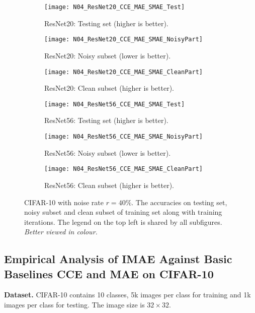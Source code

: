 \documentclass{article}
\begin{document}
\begin{figure*}[!t]
	\centering
	\vspace{-0.3cm}
	\begin{subfigure}[t!]{0.33\linewidth}
		\centering
		\texttt{[image: N04\_ResNet20\_CCE\_MAE\_SMAE\_Test]}
		\caption{ResNet20: Testing set (higher is better).}
	\end{subfigure}\begin{subfigure}[t!]{0.33\linewidth}
		\centering
		\texttt{[image: N04\_ResNet20\_CCE\_MAE\_SMAE\_NoisyPart]}
		\caption{ResNet20: Noisy subset (lower is better).}
	\end{subfigure}
	\begin{subfigure}[t!]{0.33\linewidth}
		\centering
		\texttt{[image: N04\_ResNet20\_CCE\_MAE\_SMAE\_CleanPart]}
		\caption{ResNet20: Clean subset (higher is better).}
	\end{subfigure}
\begin{subfigure}[t!]{0.33\linewidth}
		\centering
		\texttt{[image: N04\_ResNet56\_CCE\_MAE\_SMAE\_Test]}
		\caption{ResNet56: Testing set (higher is better).}
	\end{subfigure}\begin{subfigure}[t!]{0.33\linewidth}
		\centering
		\texttt{[image: N04\_ResNet56\_CCE\_MAE\_SMAE\_NoisyPart]}
		\caption{ResNet56: Noisy subset  (lower is better).}
	\end{subfigure}
	\begin{subfigure}[t!]{0.33\linewidth}
		\centering
		\texttt{[image: N04\_ResNet56\_CCE\_MAE\_SMAE\_CleanPart]}
		\caption{ResNet56: Clean subset (higher is better).}
	\end{subfigure}
\caption{CIFAR-10 with noise rate $r=40\%$. The accuracies on testing set, noisy subset and clean subset of training set along with training iterations.
		The legend on the top left is shared by all subfigures. 
		\textit{Better viewed in colour.} }
	\label{fig:ResNet2056_Noise40_CCE_MAE_SMAE_dynamics}
	\vspace{-0.1cm}
\end{figure*}











\subsection{Empirical Analysis of IMAE Against Basic Baselines CCE and MAE on CIFAR-10}
\label{sec:cifar10_experiments}
\noindent
\textbf{Dataset.} CIFAR-10 \cite{krizhevsky2009learning} contains 10 classes,  5k images per class for training and 1k images per class for testing. The image size is $32\times 32$.
\end{document}
